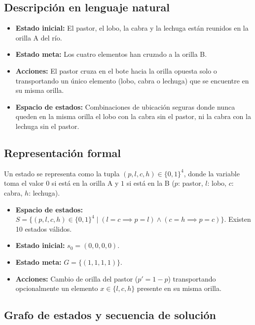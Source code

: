 \documentclass[11pt,letterpaper]{article}
\begin{document}
\subsection{Descripción en lenguaje natural}
\begin{itemize}
  \item \textbf{Estado inicial:} El pastor, el lobo, la cabra y la lechuga están reunidos en la orilla A del río.
  \item \textbf{Estado meta:} Los cuatro elementos han cruzado a la orilla B.
  \item \textbf{Acciones:} El pastor cruza en el bote hacia la orilla opuesta solo o transportando un único elemento (lobo, cabra o lechuga) que se encuentre en su misma orilla.
  \item \textbf{Espacio de estados:} Combinaciones de ubicación seguras donde nunca queden en la misma orilla el lobo con la cabra sin el pastor, ni la cabra con la lechuga sin el pastor.
\end{itemize}

\subsection{Representación formal}
Un estado se representa como la tupla $(p, l, c, h) \in \{0,1\}^4$, donde la variable toma el valor $0$ si está en la orilla A y $1$ si está en la B ($p$: pastor, $l$: lobo, $c$: cabra, $h$: lechuga).

\begin{itemize}
  \item \textbf{Espacio de estados:} $S = \{(p,l,c,h) \in \{0,1\}^4 \mid (l = c \implies p = l) \land (c = h \implies p = c)\}$. Existen 10 estados válidos.
  \item \textbf{Estado inicial:} $s_0 = (0,0,0,0)$.
  \item \textbf{Estado meta:} $G = \{(1,1,1,1)\}$.
  \item \textbf{Acciones:} Cambio de orilla del pastor ($p' = 1 - p$) transportando opcionalmente un elemento $x \in \{l, c, h\}$ presente en su misma orilla.
\end{itemize}

\subsection{Grafo de estados y secuencia de solución}
\end{document}
